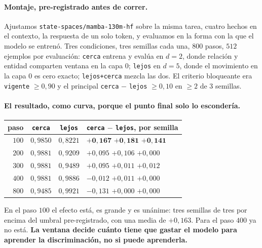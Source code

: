 \documentclass[11pt,a4paper]{article}
\begin{document}
\paragraph{Montaje, pre-registrado antes de correr.} Ajustamos \texttt{state-spaces/mamba-130m-hf}
sobre la misma tarea, cuatro hechos en el contexto, la respuesta de un solo token, y evaluamos en la
forma con la que el modelo se entrenó. Tres condiciones, tres semillas cada una, $800$ pasos, $512$
ejemplos por evaluación: \texttt{cerca} entrena y evalúa en $d{=}2$, donde relación y entidad
comparten ventana en la capa $0$; \texttt{lejos} en $d{=}5$, donde el movimiento en la capa $0$ es
cero exacto; \texttt{lejos+cerca} mezcla las dos. El criterio bloqueante era \texttt{vigente}
$\ge 0{,}90$ y el principal \texttt{cerca} $-$ \texttt{lejos} $\ge 0{,}10$ en $\ge 2$ de $3$ semillas.

\paragraph{El resultado, como curva, porque el punto final solo lo escondería.}

\begin{center}
\begin{tabular}{rccl}
\toprule
paso & \texttt{cerca} & \texttt{lejos} & \texttt{cerca} $-$ \texttt{lejos}, por semilla \\
\midrule
$100$ & $0{,}9850$ & $0{,}8221$ & $\mathbf{+0{,}167}$ \quad $\mathbf{+0{,}181}$ \quad $\mathbf{+0{,}141}$ \\
$200$ & $0{,}9881$ & $0{,}9209$ & $+0{,}095$ \quad $+0{,}106$ \quad $+0{,}000$ \\
$300$ & $0{,}9881$ & $0{,}9489$ & $+0{,}095$ \quad $+0{,}011$ \quad $+0{,}012$ \\
$400$ & $0{,}9881$ & $0{,}9886$ & $-0{,}012$ \quad $+0{,}011$ \quad $+0{,}000$ \\
$800$ & $0{,}9485$ & $0{,}9921$ & $-0{,}131$ \quad $+0{,}000$ \quad $+0{,}000$ \\
\bottomrule
\end{tabular}
\end{center}

En el paso $100$ el efecto está, es grande y es unánime: tres semillas de tres por encima del umbral
pre-registrado, con una media de $+0{,}163$. Para el paso $400$ ya no está. \textbf{La ventana decide
cuánto tiene que gastar el modelo para aprender la discriminación, no si puede aprenderla.}
\end{document}
